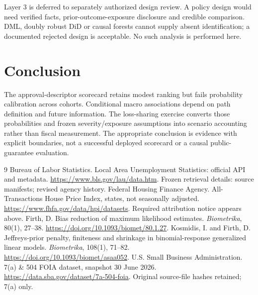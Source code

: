 Layer 3 is deferred to separately authorized design review. A policy design would need verified facts, prior-outcome-exposure disclosure and credible comparison. DML, doubly robust DiD or causal forests cannot supply absent identification; a documented rejected design is acceptable. No such analysis is performed here.

\section{Conclusion}
The approval-descriptor scorecard retains modest ranking but fails probability calibration across cohorts. Conditional macro associations depend on path definition and future information. The loss-sharing exercise converts those probabilities and frozen severity/exposure assumptions into scenario accounting rather than fiscal measurement. The appropriate conclusion is evidence with explicit boundaries, not a successful deployed scorecard or a causal public-guarantee evaluation.

\begin{thebibliography}{9}
 Bureau of Labor Statistics. Local Area Unemployment Statistics: official API and metadata. \url{https://www.bls.gov/lau/data.htm}. Frozen retrieval details: source manifests; revised agency history.
 Federal Housing Finance Agency. All-Transactions House Price Index, states, not seasonally adjusted. \url{https://www.fhfa.gov/data/hpi/datasets}. Required attribution notice appears above.
 Firth, D. Bias reduction of maximum likelihood estimates. \emph{Biometrika}, 80(1), 27--38. \url{https://doi.org/10.1093/biomet/80.1.27}.
 Kosmidis, I. and Firth, D. Jeffreys-prior penalty, finiteness and shrinkage in binomial-response generalized linear models. \emph{Biometrika}, 108(1), 71--82. \url{https://doi.org/10.1093/biomet/asaa052}.
 U.S. Small Business Administration. 7(a) \& 504 FOIA dataset, snapshot 30 June 2026. \url{https://data.sba.gov/dataset/7a-504-foia}. Original source-file hashes retained; 7(a) only.
\end{thebibliography}

\appendix
